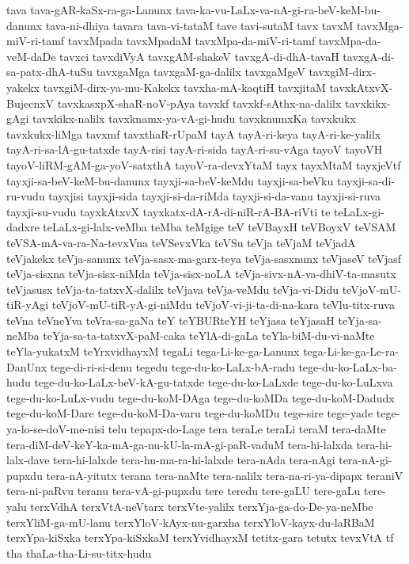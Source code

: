 {tava
tava-gAR-kaSx-ra-ga-Lanunx
tava-ka-vu-LaLx-va-nA-gi-ra-beV-keM-bu-danunx
tava-ni-dhiya
tavara
tava-vi-tataM
tave
tavi-sutaM
tavx
tavxM
tavxMga-miV-ri-tamf
tavxMpada
tavxMpadaM
tavxMpa-da-miV-ri-tamf
tavxMpa-da-veM-daDe
tavxci
tavxdiVyA
tavxgAM-shakeV
tavxgA-di-dhA-tavaH
tavxgA-di-sa-patx-dhA-tuSu
tavxgaMga
tavxgaM-ga-dalilx
tavxgaMgeV
tavxgiM-dirx-yakekx
tavxgiM-dirx-ya-mu-Kakekx
tavxha-mA-kaqtiH
tavxjitaM
tavxkAtxvX-BujecnxV
tavxkasxpX-shaR-noV-pAya
tavxkf
tavxkf-sAthx-na-dalilx
tavxkikx-gAgi
tavxkikx-nalilx
tavxknamx-ya-vA-gi-hudu
tavxknumxKa
tavxkukx
tavxkukx-liMga
tavxmf
tavxthaR-rUpaM
tayA
tayA-ri-keya
tayA-ri-ke-yalilx
tayA-ri-sa-lA-gu-tatxde
tayA-risi
tayA-ri-sida
tayA-ri-su-vAga
tayoV
tayoVH
tayoV-liRM-gAM-ga-yoV-satxthA
tayoV-ra-devxYtaM
tayx
tayxMtaM
tayxjeVtf
tayxji-sa-beV-keM-bu-danunx
tayxji-sa-beV-keMdu
tayxji-sa-beVku
tayxji-sa-di-ru-vudu
tayxjisi
tayxji-sida
tayxji-si-da-riMda
tayxji-si-da-vanu
tayxji-si-ruva
tayxji-su-vudu
tayxkAtxvX
tayxkatx-dA-rA-di-niR-rA-BA-riVti
te
teLaLx-gi-dadxre
teLaLx-gi-lalx-veMba
teMba
teMgige
teV
teVBayxH
teVBoyxV
teVSAM
teVSA-mA-va-ra-Na-tevxVna
teVSevxVka
teVSu
teVja
teVjaM
teVjadA
teVjakekx
teVja-sanunx
teVja-sasx-ma-garx-teya
teVja-sasxnunx
teVjaseV
teVjasf
teVja-sisxna
teVja-sisx-niMda
teVja-sisx-noLA
teVja-sivx-nA-va-dhiV-ta-masutx
teVjasusx
teVja-ta-tatxvX-dalilx
teVjava
teVja-veMdu
teVja-vi-Didu
teVjoV-mU-tiR-yAgi
teVjoV-mU-tiR-yA-gi-niMdu
teVjoV-vi-ji-ta-di-na-kara
teVlu-titx-ruva
teVna
teVneYva
teVra-sa-gaNa
teY
teYBURteYH
teYjasa
teYjasaH
teYja-sa-neMba
teYja-sa-ta-tatxvX-paM-caka
teYlA-di-gaLa
teYla-biM-du-vi-naMte
teYla-yukatxM
teYrxvidhayxM
tegaLi
tega-Li-ke-ga-Lanunx
tega-Li-ke-ga-Le-ra-DanUnx
tege-di-ri-si-denu
tegedu
tege-du-ko-LaLx-bA-radu
tege-du-ko-LaLx-ba-hudu
tege-du-ko-LaLx-beV-kA-gu-tatxde
tege-du-ko-LaLxde
tege-du-ko-LuLxva
tege-du-ko-LuLx-vudu
tege-du-koM-DAga
tege-du-koMDa
tege-du-koM-Dadudx
tege-du-koM-Dare
tege-du-koM-Da-varu
tege-du-koMDu
tege-sire
tege-yade
tege-ya-lo-se-doV-me-nisi
telu
tepapx-do-Lage
tera
teraLe
teraLi
teraM
tera-daMte
tera-diM-deV-keY-ka-mA-ga-nu-kU-la-mA-gi-paR-vaduM
tera-hi-lalxda
tera-hi-lalx-dave
tera-hi-lalxde
tera-hu-ma-ra-hi-lalxde
tera-nAda
tera-nAgi
tera-nA-gi-pupxdu
tera-nA-yitutx
terana
tera-naMte
tera-nalilx
tera-na-ri-ya-dipapx
teraniV
tera-ni-paRvu
teranu
tera-vA-gi-pupxdu
tere
teredu
tere-gaLU
tere-gaLu
tere-yalu
terxVdhA
terxVtA-neVtarx
terxVte-yalilx
terxYja-ga-do-De-ya-neMbe
terxYliM-ga-mU-lanu
terxYloV-kAyx-nu-garxha
terxYloV-kayx-du-laRBaM
terxYpa-kiSxka
terxYpa-kiSxkaM
terxYvidhayxM
tetitx-gara
tetutx
tevxVtA
tf
tha
thaLa-tha-Li-su-titx-hudu
}
